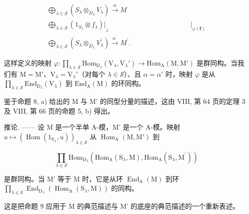 \[
\begin{array}{c} \bigoplus_ {\lambda \in \mathscr {S}} (S _ {\lambda} \otimes_ {D _ {\lambda}} V _ {\lambda}) \xrightarrow {\alpha} M \\ \bigoplus_ {\lambda \in \mathscr {S}} (1 _ {S _ {\lambda}} \otimes f _ {\lambda}) \Bigg | _ {\downarrow} \qquad \qquad \qquad \qquad \qquad \qquad \Bigg | _ {\varphi (\boldsymbol {f})} \\ \bigoplus_ {\lambda \in \mathscr {S}} (S _ {\lambda} \otimes_ {D _ {\lambda}} V _ {\lambda} ^ {\prime}) \xrightarrow {\alpha^ {\prime}} M ^ {\prime}. \end{array}
\]

这样定义的映射 \(\varphi : \prod_{\lambda \in \mathcal{S}} \mathrm{Hom}_{\mathrm{D}_{\lambda}}(\mathrm{V}_{\lambda}, \mathrm{V}_{\lambda}') \to \mathrm{Hom}_{\mathrm{A}}(\mathrm{M}, \mathrm{M}')\) 是群同构。当我们有 \(\mathrm{M} = \mathrm{M}'\)、\(\mathrm{V}_{\lambda} = \mathrm{V}_{\lambda}'\)（对每个 \(\lambda \in \mathcal{S}\)）、且 \(\alpha = \alpha'\) 时，映射 \(\varphi\) 是从 \(\prod_{\lambda \in \mathcal{S}} \mathrm{End}_{\mathrm{D}_{\lambda}}(\mathrm{V}_{\lambda})\) 到 \(\mathrm{End}_{\mathrm{A}}(\mathrm{M})\) 的环同构。

鉴于命题 8, a) 给出的 M 与 M' 的同型分量的描述，这由 VIII, 第 64 页的定理 3 及 VIII, 第 66 页的命题 5, b) 得出。

推论. —— 设 M 是一个半单 A-模，M' 是一个 A-模。映射 \(u \mapsto (\operatorname{Hom}(1_{\mathrm{S}_{\lambda}}, u))_{\lambda \in \mathcal{S}}\) 从 \(\operatorname{Hom}_{\mathrm{A}}(\mathrm{M}, \mathrm{M}')\) 到

\[
\prod_ {\lambda \in \mathcal {S}} \mathrm{Hom} _ {\mathrm{D} _ {\lambda}} (\mathrm{Hom} _ {\mathrm{A}} (\mathrm{S} _ {\lambda}, \mathrm{M}), \mathrm{Hom} _ {\mathrm{A}} (\mathrm{S} _ {\lambda}, \mathrm{M} ^ {\prime}))
\]

是群同构。当 \(\mathrm{M}'\) 等于 \(\mathrm{M}\) 时，它是从环 \(\operatorname{End}_{\mathrm{A}}(\mathrm{M})\) 到环 \(\prod_{\lambda \in \mathcal{S}} \operatorname{End}_{\mathrm{D}_{\lambda}}(\operatorname{Hom}_{\mathrm{A}}(\mathrm{S}_{\lambda}, \mathrm{M}))\) 的同构。

这是把命题 9 应用于 M 的典范描述与 M' 的底座的典范描述的一个重新表述。

